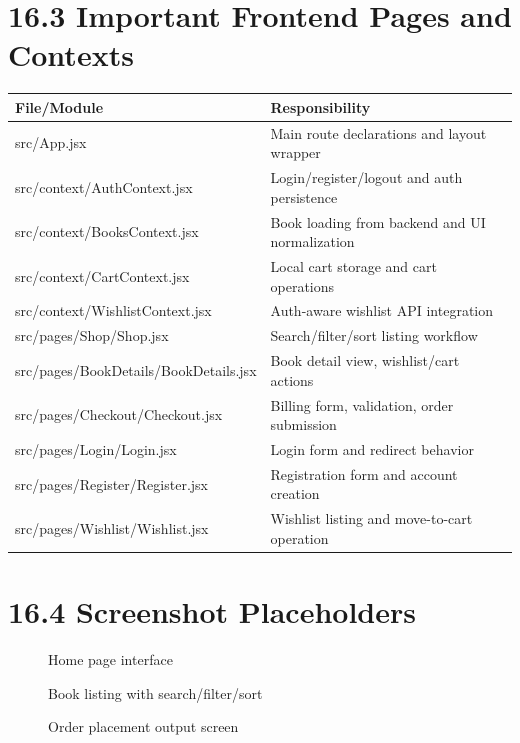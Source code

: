 \documentclass[12pt,a4paper]{report}
\begin{document}
\section*{16.3 Important Frontend Pages and Contexts}
\begin{longtable}{>{\raggedright\arraybackslash}p{} >{\raggedright\arraybackslash}p{}}
\toprule
\textbf{File/Module} & \textbf{Responsibility} \\
\midrule
src/App.jsx & Main route declarations and layout wrapper \\
src/context/AuthContext.jsx & Login/register/logout and auth persistence \\
src/context/BooksContext.jsx & Book loading from backend and UI normalization \\
src/context/CartContext.jsx & Local cart storage and cart operations \\
src/context/WishlistContext.jsx & Auth-aware wishlist API integration \\
src/pages/Shop/Shop.jsx & Search/filter/sort listing workflow \\
src/pages/BookDetails/BookDetails.jsx & Book detail view, wishlist/cart actions \\
src/pages/Checkout/Checkout.jsx & Billing form, validation, order submission \\
src/pages/Login/Login.jsx & Login form and redirect behavior \\
src/pages/Register/Register.jsx & Registration form and account creation \\
src/pages/Wishlist/Wishlist.jsx & Wishlist listing and move-to-cart operation \\
\bottomrule
\end{longtable}

\section*{16.4 Screenshot Placeholders}
\begin{figure}[H]
\centering
{}
\caption{Home page interface}
\end{figure}

\begin{figure}[H]
\centering
{}
\caption{Book listing with search/filter/sort}
\end{figure}

\begin{figure}[H]
\centering
{}
\caption{Order placement output screen}
\end{figure}
\end{document}
